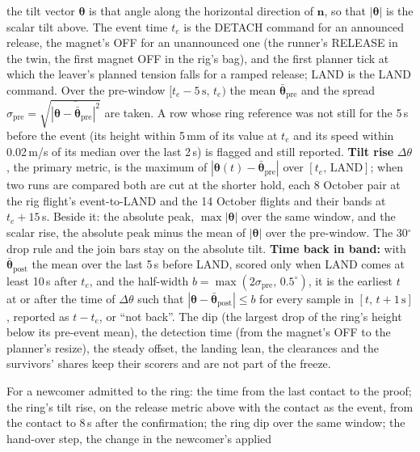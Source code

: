 \begin{description}
    the tilt vector $\boldsymbol{\theta}$ is that angle along the horizontal direction of $\mathbf{n}$, so that
    $|\boldsymbol{\theta}|$ is the scalar tilt above. The event time $t_e$ is the DETACH command for an announced
    release, the magnet's OFF for an unannounced one (the runner's RELEASE in the twin, the first magnet OFF in
    the rig's bag), and the first planner tick at which the leaver's planned tension falls for a ramped release;
    LAND is the LAND command. Over the pre-window $[t_e-5\,\mathrm{s},\,t_e)$ the mean
    $\bar{\boldsymbol{\theta}}_{\mathrm{pre}}$ and the spread
    $\sigma_{\mathrm{pre}}=\sqrt{\overline{|\boldsymbol{\theta}-\bar{\boldsymbol{\theta}}_{\mathrm{pre}}|^2}}$
    are taken. A row whose ring reference was not still for the 5\,s before the event (its height within
    5\,mm of its value at $t_e$ and its speed within 0.02\,m/s of its median over the last 2\,s) is flagged and
    still reported. \textbf{Tilt rise} $\Delta\theta$, the primary metric, is the maximum of
    $|\boldsymbol{\theta}(t)-\bar{\boldsymbol{\theta}}_{\mathrm{pre}}|$ over $[t_e,\,\mathrm{LAND}]$; when two
    runs are compared both are cut at the shorter hold, each 8 October pair at the rig flight's event-to-LAND
    and the 14 October flights and their bands at $t_e+15$\,s. Beside it: the absolute peak,
    $\max|\boldsymbol{\theta}|$ over the same window, and the scalar rise, the absolute peak minus the mean of
    $|\boldsymbol{\theta}|$ over the pre-window. The 30$^\circ$ drop rule and the join bars stay on the
    absolute tilt. \textbf{Time back in band:} with $\bar{\boldsymbol{\theta}}_{\mathrm{post}}$ the mean over
    the last 5\,s before LAND, scored only when LAND comes at least 10\,s after $t_e$, and the half-width
    $b=\max(2\sigma_{\mathrm{pre}},\,0.5^\circ)$, it is the earliest $t$ at or after the time of $\Delta\theta$
    such that $|\boldsymbol{\theta}-\bar{\boldsymbol{\theta}}_{\mathrm{post}}|\le b$ for every sample in
    $[t,\,t+1\,\mathrm{s}]$, reported as $t-t_e$, or ``not back''. The dip (the largest drop of the ring's
    height below its pre-event mean), the detection time (from the magnet's OFF to the planner's resize), the
    steady offset, the landing lean, the clearances and the survivors' shares keep their scorers and are not
    part of the freeze.
    \item[Join metrics] For a newcomer admitted to the ring: the time from the last contact to the proof; the ring's
    tilt rise, on the release metric above with the contact as the event, from the contact to 8\,s after the
    confirmation; the ring dip over the same window; the hand-over step, the change in the newcomer's applied

\end{description}
